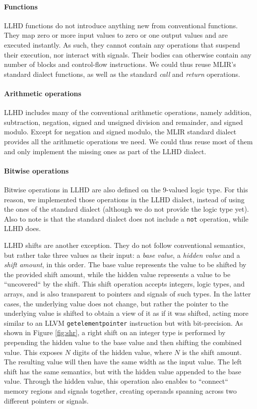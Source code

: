 \paragraph{Functions}
LLHD functions do not introduce anything new from conventional functions. They map zero or more input values to zero or one output values and are executed instantly. As such, they cannot contain any operations that suspend their execution, nor interact with signals. Their bodies can otherwise contain any number of blocks and control-flow instructions. We could thus reuse MLIR's standard dialect functions, as well as the standard \textit{call} and \textit{return} operations.

\paragraph{Arithmetic operations}
LLHD includes many of the conventional arithmetic operations, namely addition, subtraction, negation, signed and unsigned division and remainder, and signed modulo. Except for negation and signed modulo, the MLIR standard dialect provides all the arithmetic operations we need. We could thus reuse most of them and only implement the missing ones as part of the LLHD dialect.

\paragraph{Bitwise operations}
Bitwise operations in LLHD are also defined on the 9-valued logic type. For this reason, we implemented those operations in the LLHD dialect, instead of using the ones of the standard dialect (although we do not provide the logic type yet). Also to note is that the standard dialect does not include a \texttt{not} operation, while LLHD does.

LLHD shifts are another exception. They do not follow conventional semantics, but rather take three values as their input: a \textit{base value}, a \textit{hidden value} and a \textit{shift amount}, in this order. The base value represents the value to be shifted by the provided shift amount, while the hidden value represents a value to be “uncovered“ by the shift. This shift operation accepts integers, logic types, and arrays, and is also transparent to pointers and signals of such types. In the latter cases, the underlying value does not change, but rather the pointer to the underlying value is shifted to obtain a view of it as if it was shifted, acting more similar to an LLVM \texttt{getelementpointer} instruction but with bit-precision. As shown in Figure \ref{fig:shr}, a right shift on an integer type is performed by prepending the hidden value to the base value and then shifting the combined value. This exposes $N$ digits of the hidden value, where $N$ is the shift amount. The resulting value will then have the same width as the input value. The left shift has the same semantics, but with the hidden value appended to the base value.
Through the hidden value, this operation also enables to “connect“ memory regions and signals together, creating operands spanning across two different pointers or signals.

